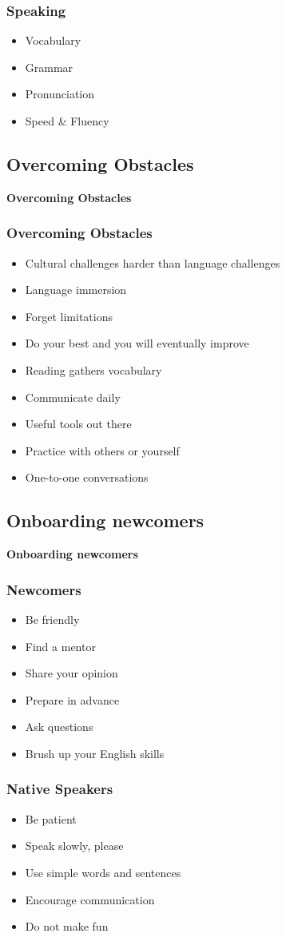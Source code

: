 \documentclass[aspectratio=169,11pt,hyperref={colorlinks=true}]{beamer}
\begin{document}
\begin{frame}
\frametitle{Speaking}
  \begin{itemize}
  \item Vocabulary
  \item Grammar
  \item Pronunciation
  \item Speed \& Fluency
  \end{itemize}
\end{frame}

\subsection{Overcoming Obstacles}
\begin{frame}
  \bf\Huge{Overcoming Obstacles}
\end{frame}

\begin{frame}
\frametitle{Overcoming Obstacles}
  \begin{itemize}
  \item Cultural challenges harder than language challenges
  \item Language immersion
  \item Forget limitations
  \item Do your best and you will eventually improve
  \item Reading gathers vocabulary
  \item Communicate daily
  \item Useful tools out there
  \item Practice with others or yourself
  \item One-to-one conversations
  \end{itemize}
\end{frame}


\subsection{Onboarding newcomers}
\begin{frame}
  \bf\Huge{Onboarding newcomers}
\end{frame}

\begin{frame}
\frametitle{Newcomers}
  \begin{itemize}
  \item Be friendly
  \item Find a mentor
  \item Share your opinion
  \item Prepare in advance
  \item Ask questions
  \item Brush up your English skills
  \end{itemize}
\end{frame}

\begin{frame}
\frametitle{Native Speakers}
  \begin{itemize}
  \item Be patient
  \item Speak slowly, please
  \item Use simple words and sentences
  \item Encourage communication
  \item Do not make fun
  \end{itemize}
\end{frame}
\end{document}
